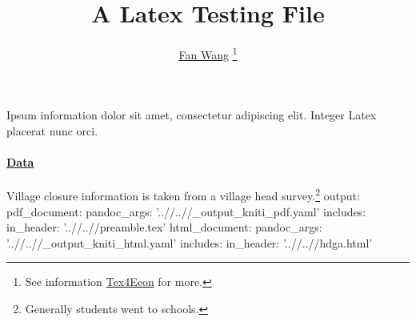 \documentclass[12pt,english]{article}
\begin{document}
\title{A Latex Testing File}
\author{\href{http://fanwangecon.github.io/}{Fan Wang} \thanks{See information \href{https://fanwangecon.github.io/Tex4Econ/}{Tex4Econ} for more.}}
\maketitle
Ipsum information dolor sit amet, consectetur adipiscing elit. Integer Latex placerat nunc orci.
\paragraph{\href{https://papers.ssrn.com/sol3/papers.cfm?abstract_id=3140132}{Data}}
Village closure information is taken from a village head survey.\footnote{Generally students went to schools.}
output:
  pdf_document:
    pandoc_args: '..//..//_output_kniti_pdf.yaml'
    includes:
      in_header: '..//..//preamble.tex'
  html_document:
    pandoc_args: '..//..//_output_kniti_html.yaml'
    includes:
      in_header: '..//..//hdga.html'
\end{document}
